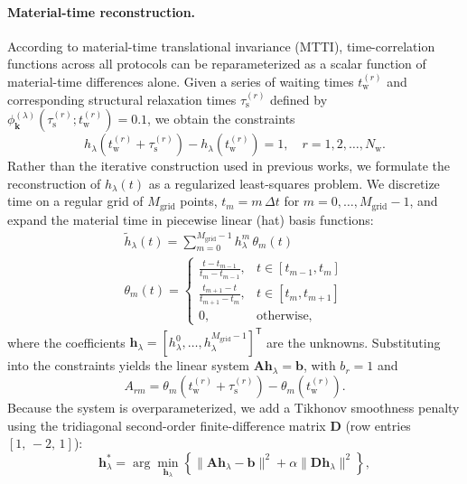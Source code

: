 \documentclass[aps, prl,
 reprint,
 superscriptaddress,
 citeautoscript,
 amsmath,amssymb,
 tightenlines
]{revtex4-2}
\begin{document}
\paragraph*{Material-time reconstruction.} \label{app:mattime}
According to material-time translational invariance (MTTI), time-correlation functions across all protocols can be reparameterized as a scalar function of material-time differences alone.
Given a series of waiting times $t_\mathrm{w}^{(r)}$ and corresponding structural relaxation times $\tau_\mathrm{s}^{(r)}$ defined by $\phi_{\bm k}^{(\lambda)}(\tau_\mathrm{s}^{(r)}; t_\mathrm{w}^{(r)}) = 0.1$, we obtain the constraints
\begin{equation}
h_\lambda(t_\mathrm{w}^{(r)} + \tau_\mathrm{s}^{(r)}) - h_\lambda(t_\mathrm{w}^{(r)}) = 1, \quad r = 1, 2, \ldots, N_\mathrm{w}.
\end{equation}
Rather than the iterative construction used in previous works,\cite{bohmer2024time,PedersenDyre2023} we formulate the reconstruction of $h_\lambda(t)$ as a regularized least-squares problem.
We discretize time on a regular grid of $M_\mathrm{grid}$ points, $t_m = m \,\Delta t$ for $m = 0, \ldots, M_\mathrm{grid}-1$, and expand the material time in piecewise linear (hat) basis functions:
\begin{gather}
\tilde{h}_\lambda(t) = \sum_{m=0}^{M_\mathrm{grid}-1} h_{\lambda}^m \,\theta_m(t)
\\
\theta_m(t)= \begin{cases}\frac{t-t_{m-1}}{t_m-t_{m-1}}, & t \in\left[t_{m-1}, t_m\right] \\ \frac{t_{m+1}-t}{t_{m+1}-t_m}, & t \in\left[t_m, t_{m+1}\right] \\ 0, & \text{otherwise,}\end{cases}
\end{gather}
where the coefficients $\boldsymbol{h}_\lambda = [h_{\lambda}^0, \ldots, h_{\lambda}^{M_\mathrm{grid}-1}]^\mathsf{T}$ are the unknowns.
Substituting into the constraints yields the linear system $\mathbf{A}\boldsymbol{h}_\lambda = \boldsymbol{b}$, with $b_r = 1$ and
\begin{equation}
A_{rm} = \theta_m(t_\mathrm{w}^{(r)} + \tau_\mathrm{s}^{(r)}) - \theta_m(t_\mathrm{w}^{(r)}). \label{eq:Amatrix}
\end{equation}
Because the system is overparameterized, we add a Tikhonov smoothness penalty using the tridiagonal second-order finite-difference matrix $\mathbf{D}$ (row entries $[1,\,-2,\,1]$):
\begin{equation}
\boldsymbol{h}_\lambda^* = \arg\min_{\boldsymbol{h}_\lambda} \left\{ \|\mathbf{A}\boldsymbol{h}_\lambda - \boldsymbol{b}\|^2
+ \alpha \|\mathbf{D}\boldsymbol{h}_\lambda\|^2 \right\},
\label{eq:regularized_LS}
\end{equation}
\end{document}
